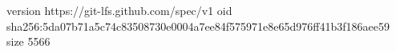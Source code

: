 version https://git-lfs.github.com/spec/v1
oid sha256:5da07b71a5c74c83508730e0004a7ee84f575971e8e65d976ff41b3f186aee59
size 5566
